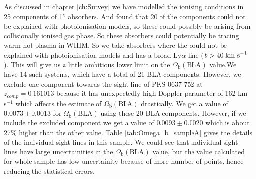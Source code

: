 As discussed in chapter \ref{ch:Survey} we have modelled the ionising conditions in 25 components of 17  absorbers. And found that 20 of the components could not be explained with photoionisation models, so these could possibly be arising from collisionally ionised gas phase. So these absorbers could potentially be tracing warm hot plasma in WHIM. So we take absorbers where the  could not be explained with photoionisation models and has a broad Ly$\alpha$ line ($\emph{b}>40 \ \text{km s}^{-1}$). This will give us a little ambitious lower limit on the $\Omega_\text{b}(\text{BLA})$ value.We have 14 such systems, which have a total of 21 BLA components. However, we exclude one component towards the sight line of PKS 0637-752 at $z_{comp}=0.161013$ because it has unexpectedly high Doppler parameter of 162 km s$^{-1}$ which affects the estimate of $\Omega_\text{b}(\text{BLA})$ drastically. We get a value of $0.0073 \pm 0.0013$ for $\Omega_\text{b}(\text{BLA})$ using these 20 BLA components. However, if we include the excluded component we get a value of $0.0093 \pm 0.0020$ which is about 27\% higher than the other value. Table \ref{tab:Omega_b_sampleA} gives the details of the individual sight lines in this sample. We could see that individual sight lines have large uncertainities in the $\Omega_\text{b}(\text{BLA})$ value, but the value calculated for whole sample has low uncertainity because of more number of points, hence reducing the statistical errors. 

\newpage

